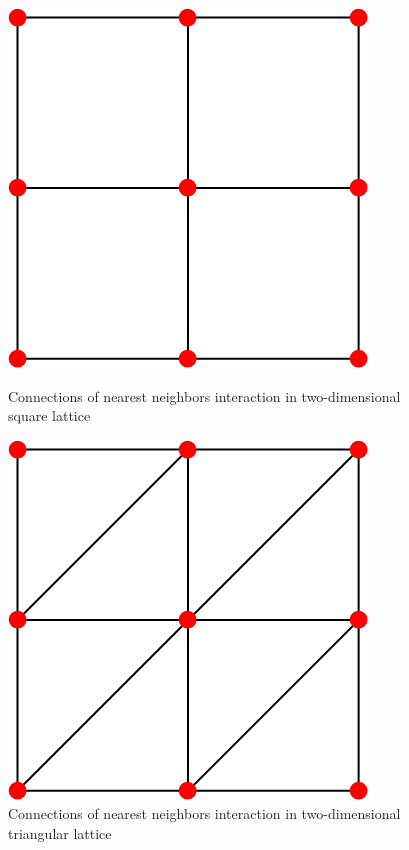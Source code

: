 \documentclass[aps,pre,amssymb,amsmath,twocolumn,floatfix]{revtex4-2}
\begin{document}
\begin{figure}[h!]
\begin{minipage}{0.45\columnwidth}
    \includegraphics[width=\textwidth]{Images/SqLattice.png}
    \caption{Connections of nearest neighbors interaction in two-dimensional square lattice}
    \label{fig:ISAW_A_J_Zoom}
\end{minipage}
\hfill
\begin{minipage}{0.45\columnwidth}
    \includegraphics[width=\textwidth]{Images/TriLattice.png}
    \caption{Connections of nearest neighbors interaction in two-dimensional triangular lattice}
    \label{fig:Is_A_J_Zoom}
\end{minipage}

\end{figure}
\end{document}
